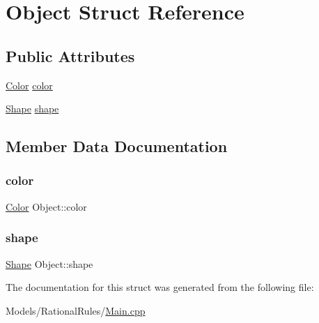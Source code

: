 \hypertarget{struct_object}{}\section{Object Struct Reference}
\label{struct_object}
\subsection*{Public Attributes}
\begin{DoxyCompactItemize}
\item 
\hyperlink{_rational_rules_2_main_8cpp_ab87bacfdad76e61b9412d7124be44c1c}{Color} \hyperlink{struct_object_a3ed85d6e0b0b62ff2501d421cb55c5e9}{color}
\item 
\hyperlink{_rational_rules_2_main_8cpp_a55b506070847a13554f8b879c1bfb37c}{Shape} \hyperlink{struct_object_a09a35e7356709e994637bd66c2c69fc4}{shape}
\end{DoxyCompactItemize}


\subsection{Member Data Documentation}
\mbox{\label{struct_object_a3ed85d6e0b0b62ff2501d421cb55c5e9}} 
\subsubsection{\texorpdfstring{color}{color}}
{\footnotesize\ttfamily \hyperlink{_rational_rules_2_main_8cpp_ab87bacfdad76e61b9412d7124be44c1c}{Color} Object\+::color}

\mbox{\label{struct_object_a09a35e7356709e994637bd66c2c69fc4}} 
\subsubsection{\texorpdfstring{shape}{shape}}
{\footnotesize\ttfamily \hyperlink{_rational_rules_2_main_8cpp_a55b506070847a13554f8b879c1bfb37c}{Shape} Object\+::shape}



The documentation for this struct was generated from the following file\+:\begin{DoxyCompactItemize}
\item 
Models/\+Rational\+Rules/\hyperlink{_rational_rules_2_main_8cpp}{Main.\+cpp}\end{DoxyCompactItemize}
